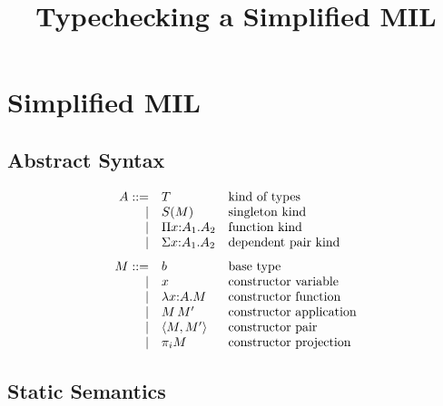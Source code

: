 \documentclass{article}
\title{Typechecking a Simplified MIL}
\theoremstyle{break}
\begin{document}
\maketitle

\section{Simplified MIL}

\subsection{Abstract Syntax}

\renewcommand{\ksingleton}[1]{S(#1)}
\renewcommand{\cfunction}[3]{\lambda #1{:}#2.#3}
\newcommand{\cpi}[2]{{\pi_{#1}}{#2}}
\newcommand{\cpair}[2]{\langle{#1},{#2}\rangle}
\renewcommand{\kind}{A}
\newcommand{\otherkind}{B}
\renewcommand{\cvar}{x}
\newcommand{\othercvar}{y}
\renewcommand{\constructor}{M}
\newcommand{\otherconstructor}{N}
\renewcommand{\substitute}[2]{\{#1{\mapsto}#2\}}


\[
\begin{array}{rll}
\kind ::= &\ktype&\mbox{kind of types}\\
    |&\ksingleton{\constructor}&\mbox{singleton kind}\\
    |&\kpi{\cvar}{\kind_1}{\kind_2}&\mbox{function kind}\\
    |&\ksigma{\cvar}{\kind_1}{\kind_2}&\mbox{dependent pair kind}\\[7pt]

\constructor ::= &\basetype&\mbox{base type}\\
    |&\cvar&\mbox{constructor variable}\\
    |&\cfunction{\cvar}{\kind}{\constructor}
         &\mbox{constructor function}\\
    |&\capply{\constructor}{\constructor'}&\mbox{constructor application}\\
    |&\cpair{\constructor}{\constructor'}&\mbox{constructor pair}\\
    |&\cpi{i}{\constructor}&\mbox{constructor projection}\\
\end{array}
\]

\subsection{Static Semantics}

\end{document}

